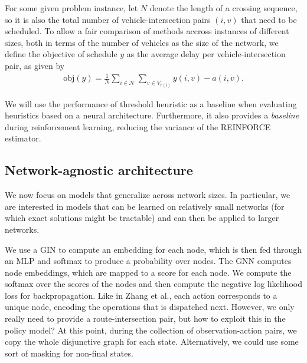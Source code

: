 \documentclass[a4paper]{article}
\theoremstyle{definition}
\theoremstyle{plain}
\begin{document}
For some given problem instance, let $N$ denote the length of a crossing
sequence, so it is also the total number of vehicle-intersection pairs $(i, v)$
that need to be scheduled. To allow a fair comparison of methods accross
instances of different sizes, both in terms of the number of vehicles as the
size of the network, we define the objective of schedule $y$ as the average
delay per vehicle-intersection pair, as given by
\begin{align*}
  \textrm{obj}(y) = \frac{1}{N} \sum_{i \in \mathcal{N}} \sum_{v \in V_{r(i)}} y(i, v) - a(i, v) .
\end{align*}


{\color{Navy} We will use the performance of threshold heuristic as a baseline
  when evaluating heuristics based on a neural architecture. Furthermore, it
  also provides a \textit{baseline} during reinforcement learning, reducing the
  variance of the REINFORCE estimator. }



\newpage
\subsection{Network-agnostic architecture}

We now focus on models that generalize across network sizes. In particular, we
are interested in models that can be learned on relatively small networks (for
which exact solutions might be tractable) and can then be applied to larger
networks.

We use a GIN to compute an embedding for each node, which is then fed through an
MLP and softmax to produce a probability over nodes. The GNN computes node
embeddings, which are mapped to a score for each node. We compute the softmax
over the scores of the nodes and then compute the negative log likelihood loss
for backpropagation.
%
Like in Zhang et al., each action corresponds to a unique node, encoding the
operations that is dispatched next. However, we only really need to provide a
route-intersection pair, but how to exploit this in the policy model?
%
At this point, during the collection of observation-action pairs, we copy the
whole disjunctive graph for each state. Alternatively, we could use some sort of
masking for non-final states.





\end{document}
